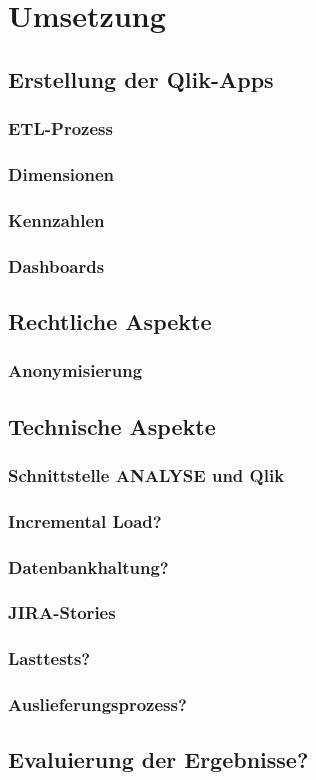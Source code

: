 \chapter{Umsetzung}
\label{umsetzung}
\minitoc\pagebreak
\lipsum[1-79]
\section{Erstellung der Qlik-Apps}
\subsection{ETL-Prozess}
\subsection{Dimensionen}
\subsection{Kennzahlen}
\subsection{Dashboards}

\section{Rechtliche Aspekte}
\subsection{Anonymisierung}

\section{Technische Aspekte}
\subsection{Schnittstelle ANALYSE und Qlik}
\subsection{Incremental Load?}
\subsection{Datenbankhaltung?}
\subsection{JIRA-Stories}
\subsection{Lasttests?}
\subsection{Auslieferungsprozess?}

\section{Evaluierung der Ergebnisse?}
